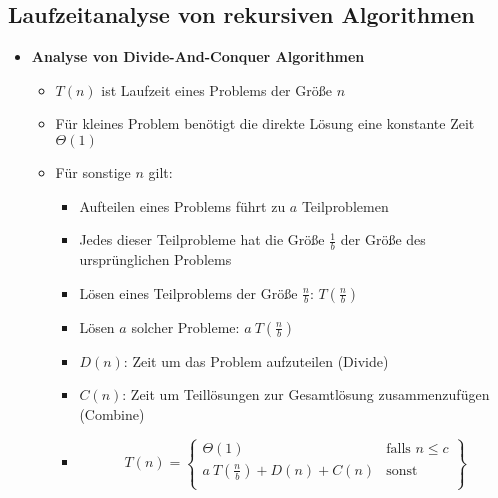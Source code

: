 \subsection{Laufzeitanalyse von rekursiven Algorithmen}
    \begin{itemize}
        \item \textbf{Analyse von Divide-And-Conquer Algorithmen}
            \begin{itemize}
                \item $T(n)$ ist Laufzeit eines Problems der Größe $n$
                \item Für kleines Problem benötigt die direkte Lösung eine konstante Zeit $\Theta(1)$
                \item Für sonstige $n$ gilt:
                    \begin{itemize}
                        \item Aufteilen eines Problems führt zu $a$ Teilproblemen
                        \item Jedes dieser Teilprobleme hat die Größe $\frac{1}{b}$ der Größe des ursprünglichen Problems
                        \item Lösen eines Teilproblems der Größe $\frac{n}{b}$: $T(\frac{n}{b})$
                        \item Lösen $a$ solcher Probleme: $a~T(\frac{n}{b})$
                        \item $D(n)$: Zeit um das Problem aufzuteilen (Divide)
                        \item $C(n)$: Zeit um Teillösungen zur Gesamtlösung zusammenzufügen (Combine)
                        \item[] \[
                                T(n) = \left.
                                    \begin{cases}
                                        \Theta(1) & \text{falls } n \leq c \\
                                        a~T(\frac{n}{b}) + D(n) + C(n) & \text{sonst}  \\
                                    \end{cases}
                                    \right \}
                                \]
                    \end{itemize}
            \end{itemize}

\pagebreak


\end{itemize}
